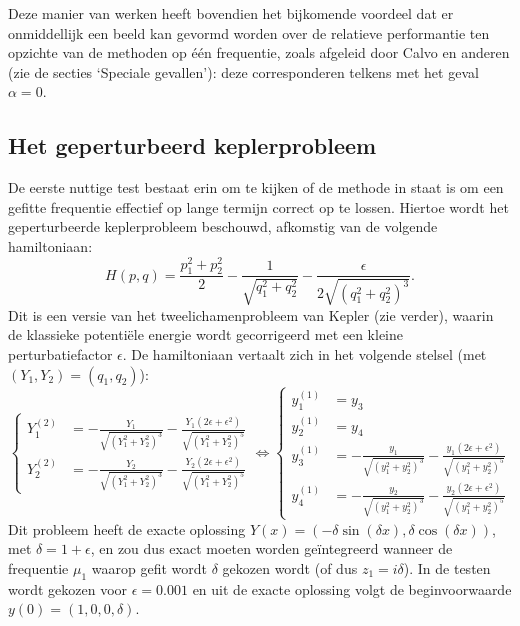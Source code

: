 \documentclass[12pt]{article}
\begin{document}
Deze manier van werken heeft bovendien het bijkomende voordeel dat er onmiddellijk een beeld kan gevormd worden over de relatieve performantie ten opzichte van de methoden op één frequentie, zoals afgeleid door Calvo en anderen (zie de secties `Speciale gevallen'): deze corresponderen telkens met het geval \(\alpha=0\).

\subsection{Het geperturbeerd keplerprobleem}
De eerste nuttige test bestaat erin om te kijken of de methode in staat is om een gefitte frequentie effectief op lange termijn correct op te lossen. Hiertoe wordt het geperturbeerde keplerprobleem beschouwd, afkomstig van de volgende hamiltoniaan:
\[H(p,q)=\frac{p_1^2+p_2^2}{2}-\frac{1}{\sqrt{q_1^2+q_2^2}}-\frac{\epsilon}{2\sqrt{(q_1^2+q_2^2)^3}}.\]
Dit is een versie van het tweelichamenprobleem van Kepler (zie verder), waarin de klassieke potentiële energie wordt gecorrigeerd met een kleine perturbatiefactor \(\epsilon\). De hamiltoniaan vertaalt zich in het volgende stelsel (met \((Y_1,Y_2)=(q_1,q_2)\)):
\begin{equation} \label{eq:pertkeplersys}
    \begin{cases}
        Y_1^{(2)}&=-\frac{Y_1}{\sqrt{(Y_1^2+Y_2^2)^3}}-\frac{Y_1(2\epsilon+\epsilon^2)}{\sqrt{(Y_1^2+Y_2^2)^5}} \\
        Y_2^{(2)}&=-\frac{Y_2}{\sqrt{(Y_1^2+Y_2^2)^3}}-\frac{Y_2(2\epsilon+\epsilon^2)}{\sqrt{(Y_1^2+Y_2^2)^5}}
    \end{cases}\Leftrightarrow
    \begin{cases}
        y_1^{(1)}&=y_3 \\
        y_2^{(1)}&=y_4 \\
        y_3^{(1)}&=-\frac{y_1}{\sqrt{(y_1^2+y_2^2)^3}}-\frac{y_1(2\epsilon+\epsilon^2)}{\sqrt{(y_1^2+y_2^2)^5}} \\
        y_4^{(1)}&=-\frac{y_2}{\sqrt{(y_1^2+y_2^2)^3}}-\frac{y_2(2\epsilon+\epsilon^2)}{\sqrt{(y_1^2+y_2^2)^5}}
    \end{cases}
\end{equation}
Dit probleem heeft de exacte oplossing \(Y(x)=(-\delta\sin(\delta x),\delta\cos(\delta x))\), met \(\delta=1+\epsilon\), en zou dus exact moeten worden geïntegreerd wanneer de frequentie \(\mu_1\) waarop gefit wordt \(\delta\) gekozen wordt (of dus \(z_1=i\delta\)). In de testen wordt gekozen voor \(\epsilon=0.001\) en uit de exacte oplossing volgt de beginvoorwaarde \(y(0)=(1,0,0,\delta)\).
\end{document}
